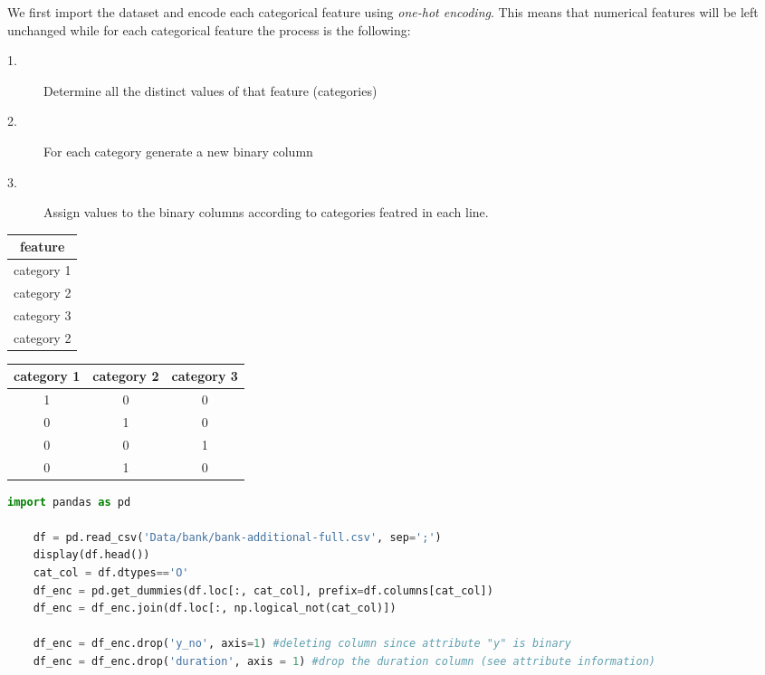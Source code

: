 We first import the dataset and encode each categorical feature using \textit{one-hot encoding}. This means that numerical features will be left unchanged while for each categorical feature the process is the following:
\begin{description}
    \item[1.] Determine all the distinct values of that feature (categories)
    \item[2.] For each category generate a new binary column
    \item[3.] Assign values to the binary columns according to categories featred in each line.   
\end{description}
\begin{center}
    \begin{tabular}{|c|}
        \hline
        feature \\
        \hline
        \hline
        category 1 \\
        \hline
        category 2 \\
        \hline
        category 3 \\
        \hline
        category 2 \\
        \hline
    \end{tabular}
    \quad
    \begin{tabular}{|c|c|c|}
        \hline
        category 1 & category 2 & category 3\\
        \hline
        \hline
        1 & 0 & 0 \\
        \hline
        0 & 1 & 0 \\
        \hline 
        0 & 0 & 1 \\
        \hline
        0 & 1 & 0 \\
        \hline
    \end{tabular}    
\end{center}
\begin{lstlisting}[language=Python, caption= Data encoding]
    import pandas as pd

    df = pd.read_csv('Data/bank/bank-additional-full.csv', sep=';')
    display(df.head())
    cat_col = df.dtypes=='O'
    df_enc = pd.get_dummies(df.loc[:, cat_col], prefix=df.columns[cat_col])
    df_enc = df_enc.join(df.loc[:, np.logical_not(cat_col)])

    df_enc = df_enc.drop('y_no', axis=1) #deleting column since attribute "y" is binary
    df_enc = df_enc.drop('duration', axis = 1) #drop the duration column (see attribute information)

\end{lstlisting}


